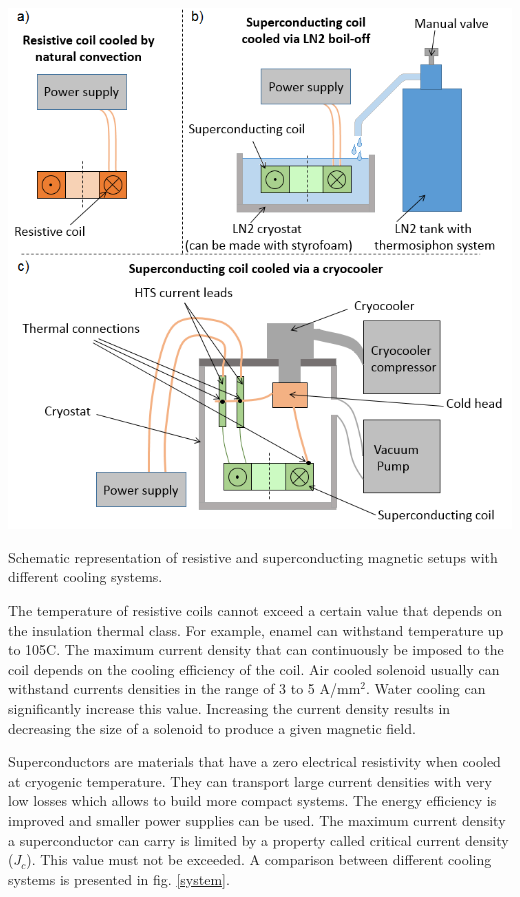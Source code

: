 \documentclass{ws-jmrr}
\begin{document}
\begin{multicols}{2}
\begin{figurehere}
\begin{center}
	\includegraphics[width=\linewidth]{fig_system_v2.png}
	\caption{Schematic representation of resistive and superconducting magnetic setups with different cooling systems.}
	\label{system}
	\end{center}
\end{figurehere}
The temperature of resistive coils cannot exceed a certain value that depends on the insulation thermal class. For example, enamel can withstand temperature up to 105\degree C.
The maximum current density that can continuously be imposed to the coil depends on the cooling efficiency of the coil. Air cooled solenoid usually can withstand currents densities in the range of 3 to 5 A/mm$^2$. Water cooling can significantly increase this value. Increasing the current density results in decreasing the size of a solenoid to produce a given magnetic field.\par
Superconductors are materials that have a zero electrical resistivity when cooled at cryogenic temperature. They can transport large current densities with very low losses which allows to build more compact systems. The energy efficiency is improved and smaller power supplies can be used. The maximum current density a superconductor can carry is limited by a property called critical current density ($J_c$). This value must not be exceeded. A comparison between different cooling systems is presented in fig. \ref{system}. \par

\end{multicols}
\end{document}
